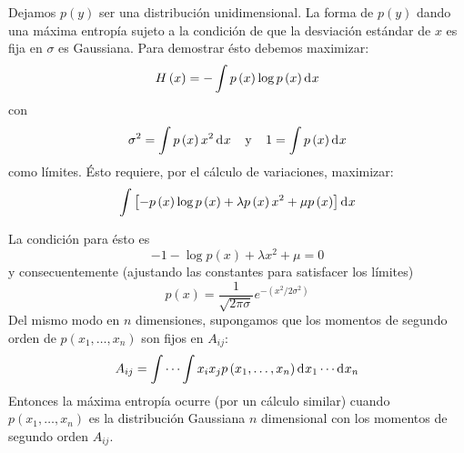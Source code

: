\item{Dejamos $p\left ( y \right )$ ser una distribuci\'on unidimensional. La forma de $p\left ( y \right )$ dando una m\'axima entrop\'ia sujeto a la condici\'on de que la desviaci\'on est\'andar de $x$ es fija en $\sigma $ es Gaussiana. Para demostrar \'esto debemos maximizar:
\begin{equation}
H\left ( x \right )=-\int p\left ( x \right )\log p\left ( x \right ) \diff x 
\end{equation}
con
\begin{equation}
\sigma^{2}=\int p\left ( x \right )x^{2} \diff x  \:\:\:\:\: \textup{y} \:\:\:\:\: 1=\int p\left ( x \right ) \diff x 
\end{equation}
como l\'imites. \'Esto requiere, por el c\'alculo de variaciones, maximizar:
\begin{equation}
\int \left [ -p\left ( x \right ) \log p\left ( x \right ) + \lambda p\left ( x \right ) x^{2} + \mu p\left ( x \right )\right ] \diff x 
\end{equation}

La condici\'on para \'esto es
\begin{equation}
-1-\log p\left ( x \right )+\lambda x^{2}+\mu =0
\end{equation}
y consecuentemente (ajustando las constantes para satisfacer los l\'imites)
\begin{equation}
p\left ( x \right )=\frac{1}{\sqrt{2\pi \sigma }}e^{-\left ( x^{2}/2\sigma ^{2} \right )}
\end{equation}
Del mismo modo en $n$ dimensiones, supongamos que los momentos de
segundo orden de $p\left ( x_{1}, \ldots ,x_{n} \right )$ son fijos en
$A_{ij}$:
\begin{equation}
A_{ij}=\int \cdots \int x_{i}x_{j}p\left ( x_{1}, \ldots ,x_{n} \right ) \diff x _{1}\cdots  \diff x_{n}
\end{equation}
Entonces la m\'axima entrop\'ia ocurre (por un c\'alculo similar)
cuando $p\left ( x_{1}, \ldots ,x_{n} \right )$ es la distribuci\'on
Gaussiana $n$ dimensional con los momentos de segundo orden $A_{ij}$.}
